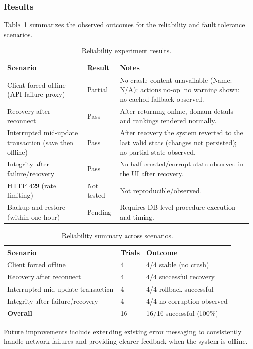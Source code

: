\documentclass[12pt, titlepage]{article}
\begin{document}
\subsubsection{Results}
Table~\ref{tab:tnf2-results} summarizes the observed outcomes for the reliability and fault tolerance scenarios.

\begin{table}[H]
  \centering
  \caption{Reliability experiment results.}
  \label{tab:tnf2-results}
  \begin{tabular}{@{}p{}p{}p{}@{}}
    \toprule
    \textbf{Scenario} & \textbf{Result} & \textbf{Notes} \\
    \midrule
    Client forced offline (API failure proxy) &
      Partial &
      No crash; content unavailable (Name: N/A); actions no-op; no warning
      shown; no cached fallback observed. \\
    Recovery after reconnect &
      Pass &
      After returning online, domain details and rankings rendered normally. \\
    Interrupted mid-update transaction (save then offline) &
      Pass &
      After recovery the system reverted to the last valid state (changes not
      persisted); no partial state observed. \\
    Integrity after failure/recovery &
      Pass &
      No half-created/corrupt state observed in the UI after recovery. \\
    HTTP 429 (rate limiting) &
      Not tested &
      Not reproducible/observed. \\
    Backup and restore (within one hour) &
      Pending &
      Requires DB-level procedure execution and timing. \\
    \bottomrule
  \end{tabular}
\end{table}
\begin{table}[H]
  \centering
  \caption{Reliability summary across scenarios.}
  \label{tab:tnf2-summary-metrics}
  \begin{tabular}{@{}p{}p{}p{}@{}}
    \toprule
    \textbf{Scenario} & \textbf{Trials} & \textbf{Outcome} \\
    \midrule
    Client forced offline &
      4 &
      4/4 stable (no crash) \\
    Recovery after reconnect &
      4 &
      4/4 successful recovery \\
    Interrupted mid-update transaction &
      4 &
      4/4 rollback successful \\
    Integrity after failure/recovery &
      4 &
      4/4 no corruption observed \\
    \midrule
    \textbf{Overall} &
      16 &
      16/16 successful (100\%) \\
    \bottomrule
  \end{tabular}
\end{table}
Future improvements include extending existing error messaging to consistently handle network failures and providing clearer feedback when the system is offline.
\end{document}
